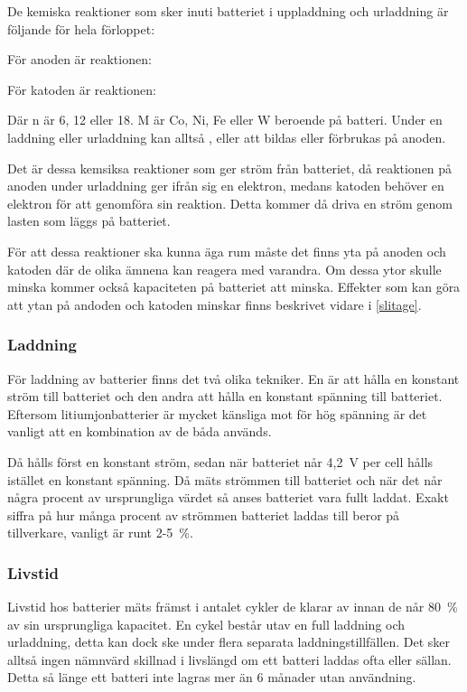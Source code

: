 \documentclass[a4paper,12pt]{article}
\begin{document}
De kemiska reaktioner som sker inuti batteriet i uppladdning och urladdning är följande för hela förloppet:

\centerline{}

För anoden är reaktionen:
\\
\centerline{}

För katoden är reaktionen:
\\
\centerline{}

Där n är 6, 12 eller 18. M är Co, Ni, Fe eller W beroende på batteri. Under en laddning eller urladdning kan alltså ,  eller  att bildas eller förbrukas på anoden. \cite{formler} 

Det är dessa kemsiksa reaktioner som ger ström från batteriet, då reaktionen på anoden under urladdning ger ifrån sig en elektron, medans katoden behöver en elektron för att genomföra sin reaktion. Detta kommer då driva en ström genom lasten som läggs på batteriet.

För att dessa reaktioner ska kunna äga rum måste det finns yta på anoden och katoden där de olika ämnena kan reagera med varandra. Om dessa ytor skulle minska kommer också kapaciteten på batteriet att minska. Effekter som kan göra att ytan på andoden och katoden minskar finns beskrivet vidare i \ref{slitage}.

\subsubsection{Laddning}
För laddning av batterier finns det två olika tekniker. En är att hålla en konstant ström till batteriet och den andra att hålla en konstant spänning till batteriet. Eftersom litiumjonbatterier är mycket känsliga mot för hög spänning är det vanligt att en kombination av de båda används.

Då hålls först en konstant ström, sedan när batteriet når 4,2~V per cell hålls istället en konstant spänning. Då mäts strömmen till batteriet och när det når några procent av ursprungliga värdet så anses batteriet vara fullt laddat. Exakt siffra på hur många procent av strömmen batteriet laddas till beror på tillverkare, vanligt är runt 2-5~\%.

\subsubsection{Livstid}
Livstid hos batterier mäts främst i antalet cykler de klarar av innan de når 80~\% av sin ursprungliga kapacitet. En cykel består utav en full laddning och urladdning, detta kan dock ske under flera separata laddningstillfällen. Det sker alltså ingen nämnvärd skillnad i livslängd om ett batteri laddas ofta eller sällan. Detta så länge ett batteri inte lagras mer än 6 månader utan användning.
\end{document}
